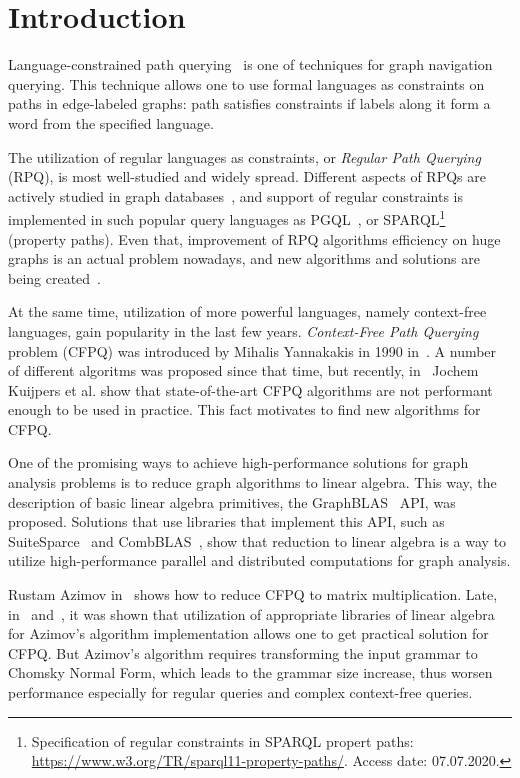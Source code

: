 \section{Introduction}


Language-constrained path querying~\cite{barrett2000formal} is one of techniques for graph navigation querying.
This technique allows one to use formal languages as constraints on paths in edge-labeled graphs: path satisfies constraints if labels along it form a word from the specified language.

The utilization of regular languages as constraints, or \textit{Regular Path Querying} (RPQ), is most well-studied and widely spread.
Different aspects of RPQs are actively studied in graph databases~\cite{10.1145/2463664.2465216, 10.1145/3104031,10.1145/2850413}, and support of regular constraints is implemented in such popular query languages as PGQL~\cite{10.1145/2960414.2960421}, or SPARQL\footnote{Specification of regular constraints in SPARQL propert paths: \url{https://www.w3.org/TR/sparql11-property-paths/}. Access date: 07.07.2020.}~\cite{10.1007/978-3-319-25007-6_1} (property paths).
Even that, improvement of RPQ algorithms efficiency on huge graphs is an actual problem nowadays, and new algorithms and solutions are being created~\cite{Wang2019,10.1145/2949689.2949711}.

At the same time, utilization of more powerful languages, namely context-free languages, gain popularity in the last few years. 
\textit{Context-Free Path Querying} problem (CFPQ) was introduced by Mihalis Yannakakis in 1990 in~\cite{Yannakakis}.
A number of different algoritms was proposed since that time, but recently, in~\cite{Kuijpers:2019:ESC:3335783.3335791} Jochem Kuijpers et al. show that state-of-the-art CFPQ algorithms are not performant enough to be used in practice.
This fact motivates to find new algorithms for CFPQ.

One of the promising ways to achieve high-performance solutions for graph analysis problems is to reduce graph algorithms to linear algebra.
This way, the description of basic linear algebra primitives, the GraphBLAS~\cite{7761646} API, was proposed.
Solutions that use libraries that implement this API, such as SuiteSparce~\cite{Davis2018Algorithm9S} and CombBLAS~\cite{10.1177/1094342011403516}, show that reduction to linear algebra is a way to utilize high-performance parallel and distributed computations for graph analysis.

Rustam Azimov in~\cite{Azimov:2018:CPQ:3210259.3210264} shows how to reduce CFPQ to matrix multiplication.
Late, in~\cite{Mishin:2019:ECP:3327964.3328503} and~\cite{10.1145/3398682.3399163}, it was shown that utilization of appropriate libraries of linear algebra for Azimov's algorithm implementation allows one to get practical solution for CFPQ.
But Azimov's algorithm requires transforming the input grammar to Chomsky Normal Form, which leads to the grammar size increase, thus worsen performance especially for regular queries and complex context-free queries.

